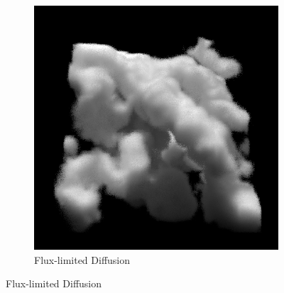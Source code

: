 \begin{figure}[h]
\begin{subfigure}[t]{0.48\columnwidth}
\includegraphics[width=\columnwidth]{06_fld/results/nebulae_ms_fld.png}
\caption{Flux-limited Diffusion}
\label{fig:fld_results_nebulae_2}
\end{subfigure}


\end{figure}
